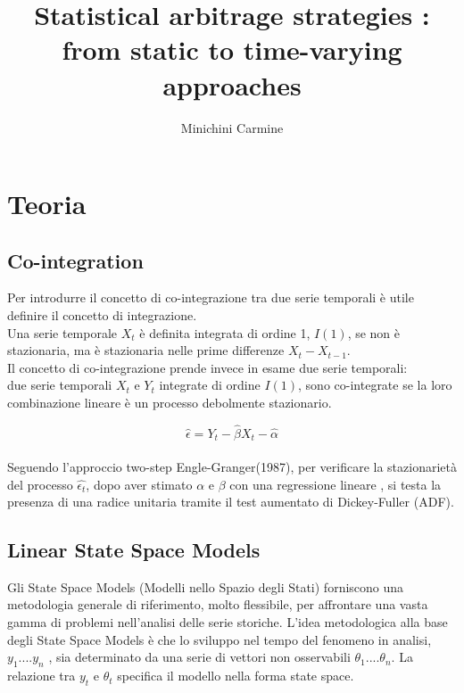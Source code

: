 \documentclass[]{article}
\title{Statistical arbitrage strategies : from static to time-varying approaches }
\author{Minichini Carmine}
\date{}
\begin{document}
\maketitle


\begin{abstract}

\end{abstract}

\section{Teoria}

\subsection{Co-integration}
Per introdurre il concetto di co-integrazione tra due serie temporali è utile definire il concetto di integrazione.
\\
Una serie temporale $X_t$ è definita integrata di ordine 1, $I(1)$, se non è stazionaria, ma è stazionaria nelle prime differenze $X_t - X_{t-1}$.
\\
Il concetto di co-integrazione prende invece in esame due serie temporali: \\ due serie temporali $X_t$ e $Y_t$ integrate di ordine $I(1)$, sono co-integrate se la loro combinazione lineare è un processo debolmente stazionario.

\begin{equation} 
	\hat{\epsilon} = Y_t - \hat{\beta}X_t - \hat{\alpha}
\end{equation}
\\
Seguendo l'approccio two-step Engle-Granger(1987), per verificare la stazionarietà del processo $\hat{\epsilon_t}$, dopo aver stimato $\alpha$ e $\beta$ con una regressione lineare , si testa la presenza di una radice unitaria tramite il test aumentato di Dickey-Fuller (ADF).

\subsection{Linear State Space Models}

Gli State Space Models (Modelli nello Spazio degli Stati) forniscono una metodologia generale di riferimento, molto flessibile, per affrontare una vasta gamma di problemi nell’analisi delle serie storiche.
L’idea metodologica alla base degli State Space Models è che lo
sviluppo nel tempo del fenomeno in analisi, $y_1....y_n$ , sia determinato da una serie di vettori non osservabili $\theta_1....\theta_n$.
La relazione tra $y_t$ e $\theta_t$ specifica il modello nella forma state space.
\end{document}
